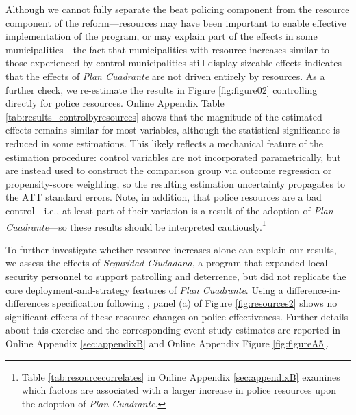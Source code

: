 Although we cannot fully separate the beat policing component from the resource component of the reform---resources may have been important to enable effective implementation of the program, or may explain part of the effects in some municipalities---the fact that municipalities with resource increases similar to those experienced by control municipalities still display sizeable effects indicates that the effects of \emph{Plan Cuadrante} are not driven entirely by resources. As a further check, we re-estimate the results in Figure \ref{fig:figure02} controlling directly for police resources. Online Appendix Table \ref{tab:results_controlbyresources} shows that the magnitude of the estimated effects remains similar for most variables, although the statistical significance is reduced in some estimations. This likely reflects a mechanical feature of the \citet{Callaway} estimation procedure: control variables are not incorporated parametrically, but are instead used to construct the comparison group via outcome regression or propensity-score weighting, so the resulting estimation uncertainty propagates to the ATT standard errors. Note, in addition, that police resources are a bad control---i.e., at least part of their variation is a result of the adoption of \emph{Plan Cuadrante}---so these results should be interpreted cautiously.\footnote{Table \ref{tab:resourcecorrelates} in Online Appendix \ref{sec:appendixB} examines which factors are associated with a larger increase in police resources upon the adoption of \emph{Plan Cuadrante}.}


\FloatBarrier

\FloatBarrier

To further investigate whether resource increases alone can explain our results, we assess the effects of \emph{Seguridad Ciudadana}, a program that expanded local security personnel to support patrolling and deterrence, but did not replicate the core deployment-and-strategy features of \emph{Plan Cuadrante}. Using a difference-in-differences specification following \citet{Callaway}, panel (a) of Figure \ref{fig:resources2} shows no significant effects of these resource changes on police effectiveness. Further details about this exercise and the corresponding event-study estimates are reported in Online Appendix \ref{sec:appendixB} and Online Appendix Figure \ref{fig:figureA5}. 



